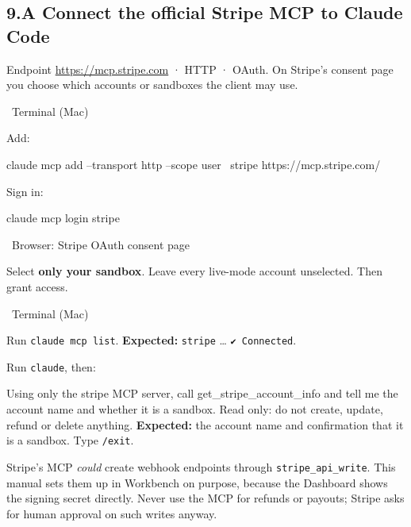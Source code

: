 \documentclass[11pt,a4paper]{article}
\newcommand{\where}[1]{\par\smallskip\noindent\colorbox{winbg}{\color{winfg}\bfseries\strut\ #1\ }\par\nopagebreak[4]}
\newcommand{\lit}[1]{\texttt{#1}}
\newenvironment{prompt}{\def\FrameCommand{\fboxsep=6pt\fcolorbox{Gray}{okbg}}\MakeFramed{\advance\hsize-\width\FrameRestore}\raggedright}{\endMakeFramed}
\begin{document}
\subsection*{9.A Connect the official Stripe MCP to Claude Code}
Endpoint \url{https://mcp.stripe.com} · HTTP · OAuth. On Stripe's consent page you choose which accounts or sandboxes the client may use.
\where{Terminal (Mac)}
\begin{steps}
\item Add:
\begin{cmd}
claude mcp add --transport http --scope user \
  stripe https://mcp.stripe.com/
\end{cmd}
\item Sign in:
\begin{cmd}
claude mcp login stripe
\end{cmd}
\where{Browser: Stripe OAuth consent page}
\item Select \textbf{only your sandbox}. Leave every live-mode account unselected. Then grant access.
\where{Terminal (Mac)}
\item Run \lit{claude mcp list}. \textbf{Expected:} \lit{stripe} … \lit{✔ Connected}.
\item Run \lit{claude}, then:
\begin{prompt}
Using only the stripe MCP server, call get\_stripe\_account\_info and tell me the account name and whether it is a sandbox. Read only: do not create, update, refund or delete anything.
\end{prompt}
\textbf{Expected:} the account name and confirmation that it is a sandbox. Type \lit{/exit}.
\end{steps}
Stripe's MCP \emph{could} create webhook endpoints through \lit{stripe\_api\_write}. This manual sets them up in Workbench on purpose, because the Dashboard shows the signing secret directly. Never use the MCP for refunds or payouts; Stripe asks for human approval on such writes anyway.
\end{document}
